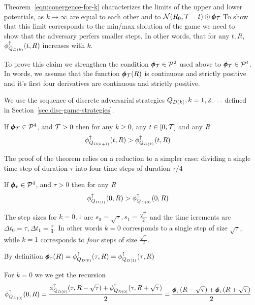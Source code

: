 \documentclass{article}[12pt]
\begin{document}
Theorem~\ref{eqn:conergence-for-k} characterizes the limits of the
upper and lower potentials, as $k \to \infty$ are equal to each other
and to ${\cal N}(R_0,\mathcal{T}-t) \odot \pmb{\phi}_{\mathcal{T}}$ To show that this
limit corresponds to the min/max slolution of the game we need to show
that the adversary perfers smaller steps. In other words, that
for any $t,R$, $\phi_{Q_{D(k)}}^{\uparrow}(t,R)$ increases with $k$.

To prove this claim we strengthen the condition $\pmb{\phi}_{\mathcal{T}} \in {\cal P}^{2}$ used above to $\pmb{\phi}_{\mathcal{T}} \in {\cal P}^{4}$. In words, we assume that the function $\pmb{\phi}_{\mathcal{T}}(R)$ is continuous and strictly positive and it's first four derivatives are continuous and strictly positive.

We use the sequence of discrete adversarial strategies
$Q_{D(k)}, k=1,2,\ldots$ defined in
Section~\ref{sec:disc-game-strategies}.

\begin{theorem}\label{thm:smallerSteps}
  If $ \pmb{\phi}_{\mathcal{T}} \in {\cal P}^{4}$, and $\mathcal{T}>0$  
  then for any $k\geq 0$, any $t \in [0,\mathcal{T}]$ and any $R$
  $$\phi_{Q_{D(k+1)}}^{\uparrow}(t,R) >  \phi_{Q_{D(k)}}^{\uparrow}(t,R)$$
\end{theorem}

The proof of the theorem relies on a reduction to a simpler case:
dividing a single time step of duration $\tau$ into four time steps of duration  $\tau/4$

\begin{lemma} \label{lemma:half-step}
  If $ \pmb{\phi}_{\tau} \in {\cal P}^{4}$, and $\tau>0$ then for any $R$
  $$\phi_{Q_{D(1)}}^{\uparrow}(0,R) >  \phi_{Q_{D(0)}}^{\uparrow}(0,R)$$
\end{lemma}
  
\proof The step sizes for $k=0,1$ are
$s_0=\sqrt{\tau}, s_1=\frac{\sqrt{\tau}}{2}$ and the time icrements
are $\Delta t_0=\tau, \Delta t_1=\frac{\tau}{4}$. 
In other words $k=0$ corresponds to a single step of size $\sqrt{\tau}$, while $k=1$ corresponds
to {\em four} steps of size $\frac{\sqrt{\tau}}{2}$.

By definition $\pmb{\phi}_{\tau}(R)=\phi_{Q_{D(0)}}^{\uparrow}(\tau,R)=\phi_{Q_{D(1)}}^{\uparrow}(\tau,R)$

For $k=0$ we we get the recursion
\begin{equation}  \label{eqn:pot-recursion-0}
  \phi_{Q_{D(0)}}^{\uparrow}(0, R) =
  \frac{\phi_{Q_{D(0)}}^{\uparrow}(\tau,R-\sqrt{\tau})+
    \phi_{Q_{D(0)}}^{\uparrow}(\tau,R+\sqrt{\tau})}{2}
  =   \frac{\pmb{\phi}_{\tau}(R-\sqrt{\tau})+
    \pmb{\phi}_{\tau}(R+\sqrt{\tau})}{2}
\end{equation}
\end{document}
